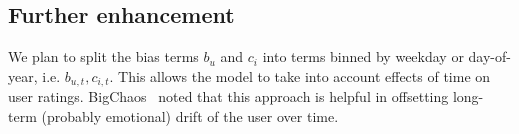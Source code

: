 \documentclass[final]{cvpr}
\begin{document}
\subsection{Further enhancement}
We plan to split the bias terms $b_u$ and $c_i$ into terms binned by weekday or day-of-year,
i.e. $b_{u,t}, c_{i,t}$.
This allows the model to take into account effects of time on user ratings.
BigChaos~\cite{BigChaos2008} noted that this approach is helpful in offsetting long-term (probably emotional) drift of the user over time.

{\small
	
	
}
\end{document}
